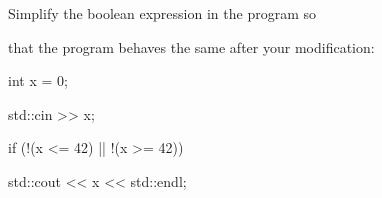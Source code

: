 Simplify the boolean expression in the program so

that the program behaves the same after your modification:

\begin{console}

int x = 0;

std::cin >> x;

if (!(x <= 42) || !(x >= 42))

   std::cout << x << std::endl;

\end{console}

